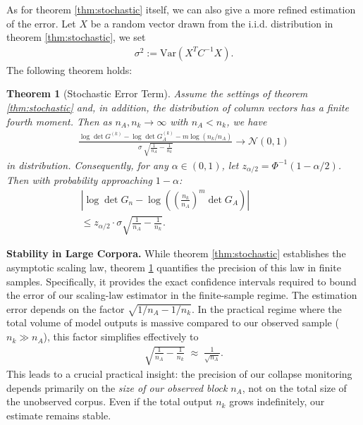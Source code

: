 \documentclass{article}
\theoremstyle{plain}
\newtheorem{theorem}{Theorem}
\theoremstyle{definition}
\theoremstyle{remark}
\begin{document}
As for theorem \ref{thm:stochastic} itself, we can also give a more refined estimation of the error. Let $X$ be a random vector drawn from the i.i.d. distribution in theorem \ref{thm:stochastic}, we set
\begin{align} \label{eq:variance_defn}
    \sigma^2 := \text{Var} \left(X^TC^{-1}X\right).
\end{align}
The following theorem holds:
\begin{theorem}[Stochastic Error Term] \label{thm:err_stochastic}
Assume the settings of theorem \ref{thm:stochastic} and, in addition, the distribution of column vectors has a finite fourth moment. Then as $n_A, n_k \to \infty$ with $n_A<n_k$, we have
\begin{align}
    \frac{\log \det G^{(k)} - \log \det G_A^{(k)} - m \log (n_k/n_A)}{\sigma \ \sqrt{\frac{1}{n_A}-\frac{1}{n_k}}} \to \mathcal{N}(0,1)
\end{align}
 in distribution. Consequently, for any $\alpha \in (0,1)$, let $z_{\alpha/2} = \Phi^{-1}(1-\alpha/2)$. Then with probability approaching $1-\alpha$:
 \begin{align} \label{eq:confi_interval}
     \left| \log \det G_n - \log \left( \left(\frac{n_k}{n_A}\right)^m \det G_{A} \right) \right| \quad \quad \quad & \nonumber \\
      \le z_{\alpha/2} \cdot \sigma  \sqrt{\frac{1}{n_A} - \frac{1}{n_k}}.&
 \end{align}
\end{theorem}

\textbf{Stability in Large Corpora.}
While theorem \ref{thm:stochastic} establishes the asymptotic scaling law, theorem \ref{thm:err_stochastic} quantifies the precision of this law in finite samples. Specifically, it provides the exact confidence intervals required to bound the error of our scaling-law estimator in the finite-sample regime. The estimation error depends on the factor $\sqrt{1/n_A - 1/n_k}$. In the practical regime where the total volume of model outputs is massive compared to our observed sample ($n_k \gg n_A$), this factor simplifies effectively to
\begin{align}
\sqrt{\frac{1}{n_A} - \frac{1}{n_k}}
\;\approx\;
\frac{1}{\sqrt{n_A}}.
\end{align}
This leads to a crucial practical insight: the precision of our collapse monitoring depends primarily on the \emph{size of our observed block} $n_A$, not on the total size of the unobserved corpus. Even if the total output $n_k$ grows indefinitely, our estimate remains stable.
\end{document}
